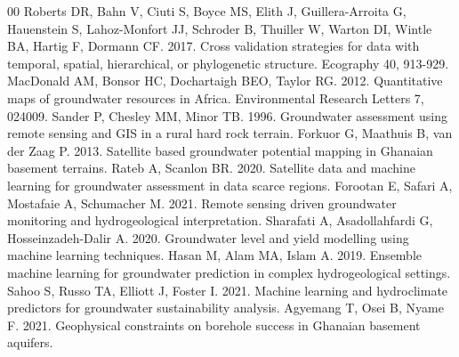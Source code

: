 \documentclass[preprint,12pt]{elsarticle}
\begin{document}
\begin{thebibliography}{00}
 Roberts DR, Bahn V, Ciuti S, Boyce MS, Elith J, Guillera-Arroita G, Hauenstein S, Lahoz-Monfort JJ, Schroder B, Thuiller W, Warton DI, Wintle BA, Hartig F, Dormann CF. 2017. Cross validation strategies for data with temporal, spatial, hierarchical, or phylogenetic structure. Ecography 40, 913-929.
 MacDonald AM, Bonsor HC, Dochartaigh BEO, Taylor RG. 2012. Quantitative maps of groundwater resources in Africa. Environmental Research Letters 7, 024009.
 Sander P, Chesley MM, Minor TB. 1996. Groundwater assessment using remote sensing and GIS in a rural hard rock terrain.
 Forkuor G, Maathuis B, van der Zaag P. 2013. Satellite based groundwater potential mapping in Ghanaian basement terrains.
 Rateb A, Scanlon BR. 2020. Satellite data and machine learning for groundwater assessment in data scarce regions.
 Forootan E, Safari A, Mostafaie A, Schumacher M. 2021. Remote sensing driven groundwater monitoring and hydrogeological interpretation.
 Sharafati A, Asadollahfardi G, Hosseinzadeh-Dalir A. 2020. Groundwater level and yield modelling using machine learning techniques.
 Hasan M, Alam MA, Islam A. 2019. Ensemble machine learning for groundwater prediction in complex hydrogeological settings.
 Sahoo S, Russo TA, Elliott J, Foster I. 2021. Machine learning and hydroclimate predictors for groundwater sustainability analysis.
 Agyemang T, Osei B, Nyame F. 2021. Geophysical constraints on borehole success in Ghanaian basement aquifers.
\end{thebibliography}
\end{document}
